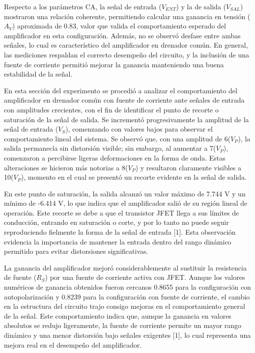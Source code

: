 \documentclass[journal]{IEEEtran}
\begin{document}
	\par Respecto a los parámetros CA, la señal de entrada (\( V_{ENT} \)) y la de salida (\( V_{SAL} \)) mostraron una relación coherente, permitiendo calcular una ganancia en tensión (\( A_V \)) aproximada de 0.83, valor que valida el comportamiento esperado del amplificador en esta configuración. Además, no se observó desfase entre ambas señales, lo cual es característico del amplificador en drenador común. En general, las mediciones respaldan el correcto desempeño del circuito, y la inclusión de una fuente de corriente permitió mejorar la ganancia manteniendo una buena estabilidad de la señal.
	\par En esta sección del experimento se procedió a analizar el comportamiento del amplificador en drenador común con fuente de corriente ante señales de entrada con amplitudes crecientes, con el fin de identificar el punto de recorte o saturación de la señal de salida. Se incrementó progresivamente la amplitud de la señal de entrada (\( V_S \)), comenzando con valores bajos para observar el comportamiento lineal del sistema. Se observó que, con una amplitud de 6(\( V_P \)), la salida permanecía sin distorsión visible; sin embargo, al aumentar a 7(\( V_P \)), comenzaron a percibirse ligeras deformaciones en la forma de onda. Estas alteraciones se hicieron más notorias a 8(\( V_P \)) y resultaron claramente visibles a 10(\( V_P \)), momento en el cual se presentó un recorte evidente en la señal de salida.
	\par En este punto de saturación, la salida alcanzó un valor máximo de 7.744 V y un mínimo de -6.414 V, lo que indica que el amplificador salió de su región lineal de operación. Este recorte se debe a que el transistor JFET llega a sus límites de conducción, entrando en saturación o corte, y por lo tanto no puede seguir reproduciendo fielmente la forma de la señal de entrada [1]. Esta observación evidencia la importancia de mantener la entrada dentro del rango dinámico permitido para evitar distorsiones significativas.
	\par La ganancia del amplificador mejoró considerablemente al sustituir la resistencia de fuente (\( R_S \)) por una fuente de corriente activa con JFET. Aunque los valores numéricos de ganancia obtenidos fueron cercanos 0.8655 para la configuración con autopolarización y 0.8239 para la configuración con fuente de corriente, el cambio en la estructura del circuito trajo consigo mejoras en el comportamiento general de la señal. Este comportamiento indica que, aunque la ganancia en valores absolutos se redujo ligeramente, la fuente de corriente permite un mayor rango dinámico y una menor distorsión bajo señales exigentes [1], lo cual representa una mejora real en el desempeño del amplificador.
\end{document}
